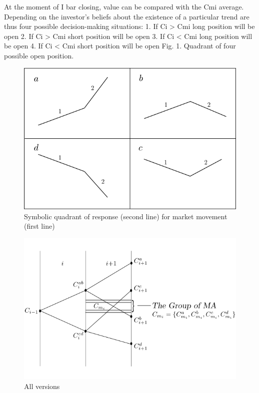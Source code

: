 \documentclass{tewiart}
\begin{document}
At the moment of I bar closing, value can be compared with the Cmi average. Depending on the investor's beliefs about the existence of a particular trend are thus four possible decision-making situations:
1. If Ci  > Cmi  long position will be open
2. If Ci  > Cmi  short position will be open
3. If Ci  < Cmi  long position will be open
4. If Ci  < Cmi  short position will be open
Fig. 1. Quadrant of four possible open position.

\begin{figure}[h]
 \centering
 \includegraphics[width=\textwidth]{Rysunek0_all2.png}
 \caption{Symbolic quadrant of response (second line) for market movement (first line)}
\end{figure}
\FloatBarrier

\begin{figure}[h]
\centering
\centering 
\includegraphics[width=\textwidth]{rysunek1pp.png}
\caption{All versions}
\end{figure}
\FloatBarrier
\end{document}
